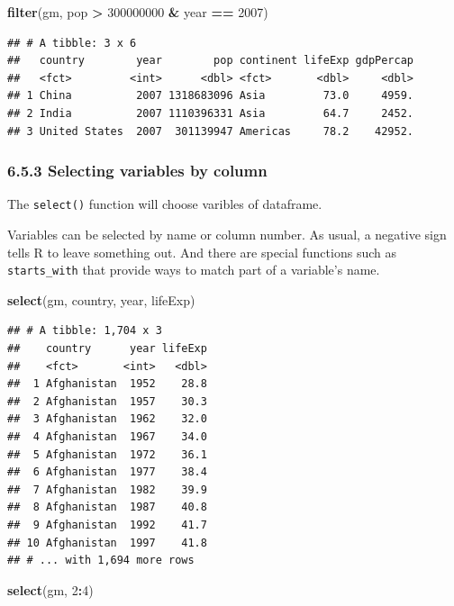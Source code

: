 \documentclass[]{article}
\newenvironment{Shaded}{\begin{snugshade}}{\end{snugshade}}
\newcommand{\KeywordTok}[1]{\textcolor[rgb]{0.13,0.29,0.53}{\textbf{#1}}}
\newcommand{\DecValTok}[1]{\textcolor[rgb]{0.00,0.00,0.81}{#1}}
\newcommand{\StringTok}[1]{\textcolor[rgb]{0.31,0.60,0.02}{#1}}
\newcommand{\OperatorTok}[1]{\textcolor[rgb]{0.81,0.36,0.00}{\textbf{#1}}}
\newcommand{\NormalTok}[1]{#1}
\begin{document}
\begin{Shaded}
\begin{Highlighting}[]
\KeywordTok{filter}\NormalTok{(gm, pop }\OperatorTok{>}\StringTok{ }\DecValTok{300000000} \OperatorTok{&}\StringTok{ }\NormalTok{year }\OperatorTok{==}\StringTok{ }\DecValTok{2007}\NormalTok{)}
\end{Highlighting}
\end{Shaded}

\begin{verbatim}
## # A tibble: 3 x 6
##   country        year        pop continent lifeExp gdpPercap
##   <fct>         <int>      <dbl> <fct>       <dbl>     <dbl>
## 1 China          2007 1318683096 Asia         73.0     4959.
## 2 India          2007 1110396331 Asia         64.7     2452.
## 3 United States  2007  301139947 Americas     78.2    42952.
\end{verbatim}

\subsubsection{6.5.3 Selecting variables by
column}\label{selecting-variables-by-column}

The \texttt{select()} function will choose varibles of dataframe.

Variables can be selected by name or column number. As usual, a negative
sign tells R to leave something out. And there are special functions
such as \texttt{starts\_with} that provide ways to match part of a
variable's name.

\begin{Shaded}
\begin{Highlighting}[]
\KeywordTok{select}\NormalTok{(gm, country, year, lifeExp)}
\end{Highlighting}
\end{Shaded}

\begin{verbatim}
## # A tibble: 1,704 x 3
##    country      year lifeExp
##    <fct>       <int>   <dbl>
##  1 Afghanistan  1952    28.8
##  2 Afghanistan  1957    30.3
##  3 Afghanistan  1962    32.0
##  4 Afghanistan  1967    34.0
##  5 Afghanistan  1972    36.1
##  6 Afghanistan  1977    38.4
##  7 Afghanistan  1982    39.9
##  8 Afghanistan  1987    40.8
##  9 Afghanistan  1992    41.7
## 10 Afghanistan  1997    41.8
## # ... with 1,694 more rows
\end{verbatim}

\begin{Shaded}
\begin{Highlighting}[]
\KeywordTok{select}\NormalTok{(gm, }\DecValTok{2}\OperatorTok{:}\DecValTok{4}\NormalTok{)}
\end{Highlighting}
\end{Shaded}
\end{document}
